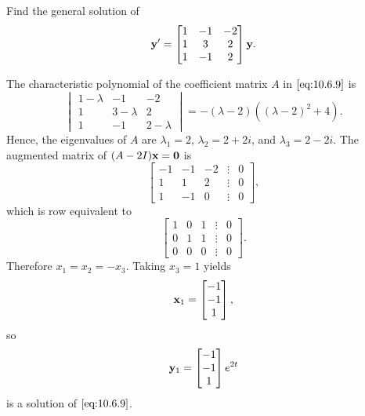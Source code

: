 \documentclass{ximera}
\begin{document}
\begin{example}\label{example:10.6.4}
 Find the general solution of
\begin{equation} \label{eq:10.6.9}
{\bf y}'=\begin{bmatrix}1&-1&-2\\1&3&2\\1&-1&2\end{bmatrix}{\bf y}.
\end{equation}

\begin{explanation} The characteristic
polynomial of the  coefficient matrix $A$ in  $\eqref{eq:10.6.9}$ is
$$
\begin{vmatrix} 1-\lambda&-1&-2\\ 1&3-\lambda&
2\\ 1
&-1&2-\lambda\end{vmatrix}=
-(\lambda-2)\left((\lambda-2)^2+4\right).
 $$
Hence, the eigenvalues of $A$ are $\lambda_1=2$, $\lambda_2=2+2i$,
and $\lambda_3=2-2i$.
The augmented matrix of $(A-2I){\bf x=0}$ is
$$
\begin{bmatrix}-1&-1&-2&\vdots&0\\1&
1&2&\vdots&0\\ 1&-1&0&\vdots&0
\end{bmatrix},
$$
which is row equivalent to
$$
\begin{bmatrix} 1&0&1&\vdots&0\\ 0&1&1&
\vdots&0\\ 0&0&0&\vdots&0\end{bmatrix}.
$$
Therefore $x_1=x_2=-x_3$.  Taking $x_3=1$ yields
$$
{\bf x}_1=\begin{bmatrix}-1\\-1\\1\end{bmatrix},
$$
so
$$
{\bf y}_1=\begin{bmatrix}-1\\-1\\1\end{bmatrix}e^{2t}
$$
is a solution of  $\eqref{eq:10.6.9}$.


\end{explanation}
\end{example}
\end{document}
